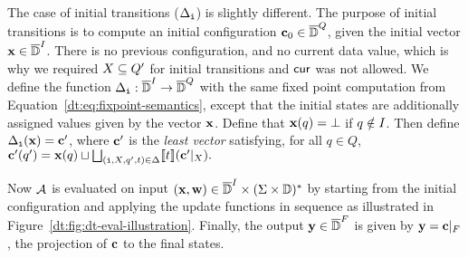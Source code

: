 The case of initial transitions ($\Delta_{\texttt{i}}$) is slightly different. The purpose of initial transitions is to compute an initial configuration $\mathbf{c}_0 \in \overline{\mathbb{D}{}}^{Q}$, given the initial vector $\mathbf{x} \in \overline{\mathbb{D}{}}^I$. There is no previous configuration, and no current data value, which is why we required $X \subseteq Q'$ for initial transitions and $\mathsf{cur}$ was not allowed.
We define the function $\Delta_{\texttt{i}}: \overline{\mathbb{D}{}}^I \to \overline{\mathbb{D}{}}^Q$ with the same fixed point computation from Equation~\eqref{dt:eq:fixpoint-semantics}, except that the initial states are additionally assigned values given by the vector $\mathbf{x}$. Define that $\mathbf{x}(q) = \bot$ if $q \notin I$. Then define $\Delta_{\texttt{i}}(\mathbf{x}) = \mathbf{c}'$, where $\mathbf{c}'$ is the \emph{least vector} satisfying, for all $q \in Q$,
$\mathbf{c}'(q') = \mathbf{x}(q) \sqcup \bigsqcup_{(\texttt{i}, X, q', t) \in \Delta} \llbracket t \rrbracket(\mathbf{c}'|_X).$

Now $\mathcal{A}$ is evaluated on input
$(\mathbf{x}, \mathbf{w}) \in \overline{\mathbb{D}{}}^I \times (\Sigma \times \mathbb{D})^*$
by starting from the initial configuration and applying the update functions in sequence as illustrated in
Figure~\ref{dt:fig:dt-eval-illustration}.
Finally, the output $\mathbf{y} \in \overline{\mathbb{D}{}}^F$ is given by $\mathbf{y} = \mathbf{c}|_{F}$, the projection of $\mathbf{c}$ to the final states.

